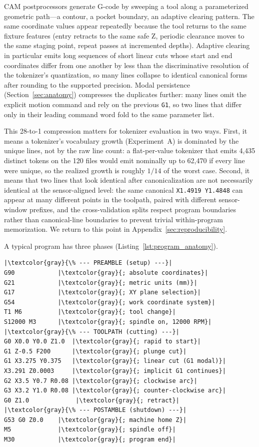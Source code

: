 \documentclass[11pt]{article}
\begin{document}
CAM postprocessors generate G-code by sweeping a tool along a parameterized geometric path---a contour, a pocket boundary, an adaptive clearing pattern. The same coordinate values appear repeatedly because the tool returns to the same fixture features (entry retracts to the same safe Z, periodic clearance moves to the same staging point, repeat passes at incremented depths). Adaptive clearing in particular emits long sequences of short linear cuts whose start and end coordinates differ from one another by less than the discriminative resolution of the tokenizer's quantization, so many lines collapse to identical canonical forms after rounding to the supported precision. Modal persistence (Section~\ref{sec:anatomy}) compresses the duplicates further: many lines omit the explicit motion command and rely on the previous \texttt{G1}, so two lines that differ only in their leading command word fold to the same parameter list.

This 28-to-1 compression matters for tokenizer evaluation in two ways. First, it means a tokenizer's vocabulary growth (Experiment~A) is dominated by the unique lines, not by the raw line count: a flat-per-value tokenizer that emits 4{,}435 distinct tokens on the 120 files would emit nominally up to 62{,}470 if every line were unique, so the realized growth is roughly $1/14$ of the worst case. Second, it means that two lines that look identical after canonicalization are not necessarily identical at the sensor-aligned level: the same canonical \texttt{X1.4919 Y1.4848} can appear at many different points in the toolpath, paired with different sensor-window prefixes, and the cross-validation splits respect program boundaries rather than canonical-line boundaries to prevent trivial within-program memorization. We return to this point in Appendix~\ref{sec:reproducibility}.

A typical program has three phases (Listing~\ref{lst:program_anatomy}).

\begin{lstlisting}[caption={Anatomy of a CNC milling program.},label=lst:program_anatomy,escapechar=|,float=htbp]
|\textcolor{gray}{\% --- PREAMBLE (setup) ---}|
G90            |\textcolor{gray}{; absolute coordinates}|
G21            |\textcolor{gray}{; metric units (mm)}|
G17            |\textcolor{gray}{; XY plane selection}|
G54            |\textcolor{gray}{; work coordinate system}|
T1 M6          |\textcolor{gray}{; tool change}|
S12000 M3      |\textcolor{gray}{; spindle on, 12000 RPM}|
|\textcolor{gray}{\% --- TOOLPATH (cutting) ---}|
G0 X0.0 Y0.0 Z1.0  |\textcolor{gray}{; rapid to start}|
G1 Z-0.5 F200      |\textcolor{gray}{; plunge cut}|
G1 X3.275 Y0.375   |\textcolor{gray}{; linear cut (G1 modal)}|
X3.291 Z0.0003     |\textcolor{gray}{; implicit G1 continues}|
G2 X3.5 Y0.7 R0.08 |\textcolor{gray}{; clockwise arc}|
G3 X3.2 Y1.0 R0.08 |\textcolor{gray}{; counter-clockwise arc}|
G0 Z1.0             |\textcolor{gray}{; retract}|
|\textcolor{gray}{\% --- POSTAMBLE (shutdown) ---}|
G53 G0 Z0.0    |\textcolor{gray}{; machine home Z}|
M5             |\textcolor{gray}{; spindle off}|
M30            |\textcolor{gray}{; program end}|
\end{lstlisting}
\end{document}
